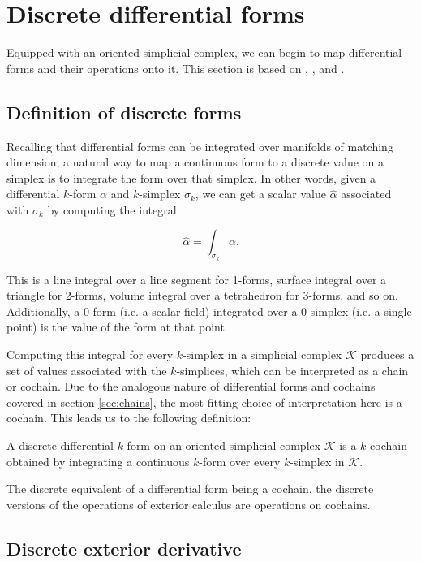 \documentclass[utf8,english]{gradu3}
\begin{document}
\section{Discrete differential forms}

Equipped with an oriented simplicial complex,
we can begin to map differential forms and their operations onto it.
This section is based on \parencite{desbrun_discrete_2006},
\parencite{crane_digital_2013}, and \parencite{blair_perot_differential_2014}.


\subsection{Definition of discrete forms}\label{sec:discrete_forms}

Recalling that differential forms can be integrated
over manifolds of matching dimension,
a natural way to map a continuous form to a discrete value on a simplex
is to integrate the form over that simplex.
In other words, given a differential $k$-form $\alpha$
and $k$-simplex $\sigma_k$, we can get a scalar value $\widehat{\alpha}$
associated with $\sigma_k$ by computing the integral

\[
  \widehat{\alpha} = \int_{\sigma_k} \alpha.
\]

This is a line integral over a line segment for 1-forms,
surface integral over a triangle for 2-forms,
volume integral over a tetrahedron for 3-forms, and so on.
Additionally, a 0-form (i.e. a scalar field)
integrated over a 0-simplex (i.e. a single point)
is the value of the form at that point.

Computing this integral for every $k$-simplex in a simplicial complex $\mathcal{K}$
produces a set of values associated with the $k$-simplices,
which can be interpreted as a chain or cochain.
Due to the analogous nature of differential forms and cochains
covered in section \ref{sec:chains},
the most fitting choice of interpretation here is a cochain.
This leads us to the following definition:

A discrete differential $k$-form on an oriented simplicial complex $\mathcal{K}$
is a $k$-cochain obtained by integrating a continuous $k$-form
over every $k$-simplex in $\mathcal{K}$.

The discrete equivalent of a differential form being a cochain,
the discrete versions of the operations of exterior calculus
are operations on cochains.


\subsection{Discrete exterior derivative}\label{sec:disc_ext_der}
\end{document}
